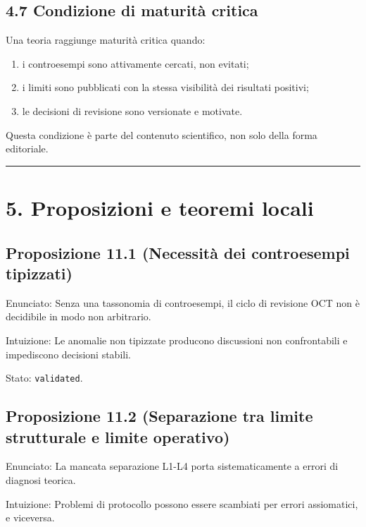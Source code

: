 \subsection{4.7 Condizione di maturità critica}

Una teoria raggiunge maturità critica quando:

\begin{enumerate}
\def\labelenumi{\arabic{enumi}.}
\tightlist
\item
  i controesempi sono attivamente cercati, non evitati;
\item
  i limiti sono pubblicati con la stessa visibilità dei risultati positivi;
\item
  le decisioni di revisione sono versionate e motivate.
\end{enumerate}

Questa condizione è parte del contenuto scientifico, non solo della forma editoriale.

\begin{center}\rule{0.5\linewidth}{0.5pt}\end{center}

\section{5. Proposizioni e teoremi locali}

\subsection{Proposizione 11.1 (Necessità dei controesempi tipizzati)}

Enunciato:
Senza una tassonomia di controesempi, il ciclo di revisione OCT non è decidibile in modo non arbitrario.

Intuizione:
Le anomalie non tipizzate producono discussioni non confrontabili e impediscono decisioni stabili.

Stato: \texttt{validated}.

\subsection{Proposizione 11.2 (Separazione tra limite strutturale e limite operativo)}

Enunciato:
La mancata separazione L1-L4 porta sistematicamente a errori di diagnosi teorica.

Intuizione:
Problemi di protocollo possono essere scambiati per errori assiomatici, e viceversa.

